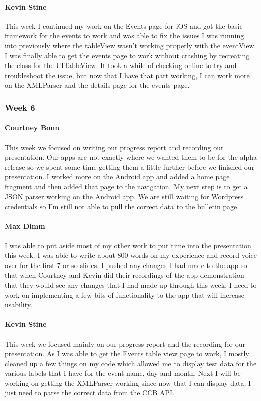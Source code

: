 			\paragraph{Kevin Stine}
			This week I continued my work on the Events page for iOS and got the basic framework for the events to work and was able to fix the issues I was running into previously where the tableView wasn't working properly with the eventView. I was finally able to get the events page to work without crashing by recreating the class for the UITableView. It took a while of checking online to try and troubleshoot the issue, but now that I have that part working, I can work more on the XMLParser and the details page for the events page.
			
		\subsubsection{Week 6}
		
			\paragraph{Courtney Bonn}
			This week we focused on writing our progress report and recording our presentation. Our apps are not exactly where we wanted them to be for the alpha release so we spent some time getting them a little further before we finished our presentation. I worked more on the Android app and added a home page fragment and then added that page to the navigation. My next step is to get a JSON parser working on the Android app. We are still waiting for Wordpress credentials so I'm still not able to pull the correct data to the bulletin page.

			\paragraph{Max Dimm}
			I was able to put aside most of my other work to put time into the presentation this week. I was able to write about 800 words on my experience and record voice over for the first 7 or so slides. I pushed any changes I had made to the app so that when Courtney and Kevin did their recordings of the app demonstration that they would see any changes that I had made up through this week. I need to work on implementing a few bits of functionality to the app that will increase usability.
			
			\paragraph{Kevin Stine}
			This week we focused mainly on our progress report and the recording for our presentation. As I was able to get the Events table view page to work, I mostly cleaned up a few things on my code which allowed me to display test data for the various labels that I have for the event name, day and month. Next I will be working on getting the XMLParser working since now that I can display data, I just need to parse the correct data from the CCB API.
			
